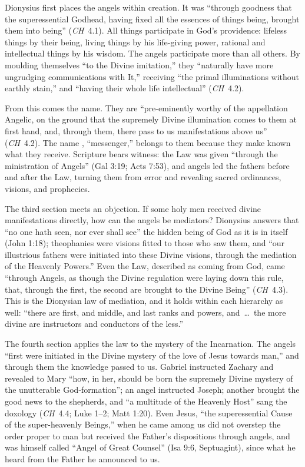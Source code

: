 Dionysius first places the angels within creation. It was ``through
goodness that the superessential Godhead, having fixed all the essences
of things being, brought them into being'' (\emph{CH}~4.1). All things
participate in God's providence: lifeless things by their being, living
things by his life-giving power, rational and intellectual things by his
wisdom. The angels participate more than all others. By moulding
themselves ``to the Divine imitation,'' they ``naturally have more
ungrudging communications with It,'' receiving ``the primal
illuminations without earthly stain,'' and ``having their whole life
intellectual'' (\emph{CH}~4.2).

From this comes the name. They are ``pre-eminently worthy of the
appellation Angelic, on the ground that the supremely Divine illumination
comes to them at first hand, and, through them, there pass to us
manifestations above us'' (\emph{CH}~4.2). The name ,
``messenger,'' belongs to them because they make known what they receive.
Scripture bears witness: the Law was given ``through the ministration of
Angels'' (Gal 3:19; Acts 7:53), and angels led the fathers before and
after the Law, turning them from error and revealing sacred ordinances,
visions, and prophecies.

The third section meets an objection. If some holy men received divine
manifestations directly, how can the angels be mediators? Dionysius
answers that ``no one hath seen, nor ever shall see'' the hidden being of
God as it is in itself (John 1:18); theophanies were visions fitted to
those who saw them, and ``our illustrious fathers were initiated into
these Divine visions, through the mediation of the Heavenly Powers.''
Even the Law, described as coming from God, came ``through Angels, as
though the Divine regulation were laying down this rule, that, through
the first, the second are brought to the Divine Being'' (\emph{CH}~4.3). This is the Dionysian law of mediation, and it holds within each
hierarchy as well: ``there are first, and middle, and last ranks and
powers, and~\dots\ the more divine are instructors and conductors of the
less.''

The fourth section applies the law to the mystery of the Incarnation.
The angels ``first were initiated in the Divine mystery of the love of
Jesus towards man,'' and through them the knowledge passed to us.
Gabriel instructed Zachary and revealed to Mary ``how, in her, should be
born the supremely Divine mystery of the unutterable God-formation''; an
angel instructed Joseph; another brought the good news to the shepherds,
and ``a multitude of the Heavenly Host'' sang the doxology (\emph{CH}~4.4; Luke 1--2; Matt 1:20). Even Jesus, ``the superessential Cause of the
super-heavenly Beings,'' when he came among us did not overstep the order
proper to man but received the Father's dispositions through angels, and
was himself called ``Angel of Great Counsel'' (Isa 9:6, Septuagint), since
what he heard from the Father he announced to us.


